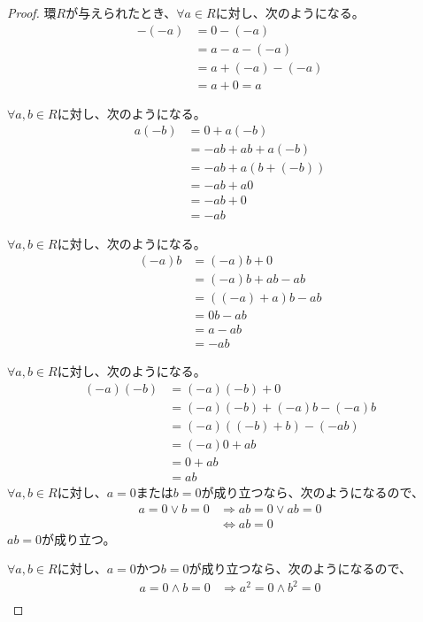 \documentclass[dvipdfmx]{jsarticle}
\begin{document}
\begin{proof} 環$R$が与えられたとき、$\forall a\in R$に対し、次のようになる。
  \begin{align*}
  - ( - a) &= 0 - ( - a)\\
  &= a - a - ( - a)\\
  &= a + ( - a) - ( - a)\\
  &= a + 0 = a
  \end{align*}\par
  $\forall a,b\in R$に対し、次のようになる。
  \begin{align*}
  a( - b) &= 0 + a( - b)\\
  &= - ab + ab + a( - b)\\
  &= - ab + a\left( b + ( - b) \right)\\
  &= - ab + a0\\
  &= - ab + 0\\
  &= - ab
  \end{align*}\par
  $\forall a,b\in R$に対し、次のようになる。
  \begin{align*}
  ( - a)b &= ( - a)b + 0\\
  &= ( - a)b + ab - ab\\
  &= \left( ( - a) + a \right)b - ab\\
  &= 0b - ab\\
  &= a - ab\\
  &= - ab
  \end{align*}\par
  $\forall a,b\in R$に対し、次のようになる。
  \begin{align*}
  ( - a)( - b) &= ( - a)( - b) + 0\\
  &= ( - a)( - b) + ( - a)b - ( - a)b\\
  &= ( - a)\left( ( - b) + b \right) - ( - ab)\\
  &= ( - a)0 + ab\\
  &= 0 + ab\\
  &= ab
  \end{align*}
  $\forall a,b\in R$に対し、$a=0$または$b=0$が成り立つなら、次のようになるので、
  \begin{align*}
  a = 0 \vee b = 0 &\Rightarrow ab = 0 \vee ab = 0\\
  &\Leftrightarrow ab = 0
  \end{align*}
  $ab=0$が成り立つ。\par
  $\forall a,b\in R$に対し、$a=0$かつ$b=0$が成り立つなら、次のようになるので、
  \begin{align*}
  a = 0 \land b = 0 &\Rightarrow a^{2} = 0 \land b^{2} = 0\\

\end{align*}
\end{proof}
\end{document}
